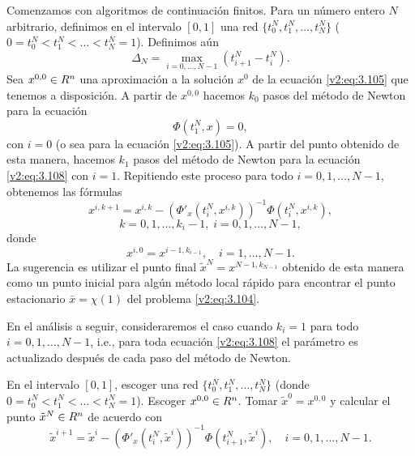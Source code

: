 Comenzamos con algoritmos de continuación finitos. Para un número entero $N$ arbitrario, definimos en el intervalo $[0, 1]$ una red $\{t_0^N, t_1^N, \dots, t_N^N\}$ ($0 = t_0^N < t_1^N < \dots < t_N^N = 1$). Definimos aún
\begin{equation}
    \Delta_N = \max_{i=0, \dots, N-1} (t_{i+1}^N - t_i^N).
    \label{v2:eq:3.107}
\end{equation}
Sea $x^{0,0} \in R^n$ una aproximación a la solución $x^0$ de la ecuación \eqref{v2:eq:3.105} que tenemos a disposición. A partir de $x^{0,0}$ hacemos $k_0$ pasos del método de Newton para la ecuación
\begin{equation}
    \Phi(t_1^N, x) = 0,
    \label{v2:eq:3.108}
\end{equation}
con $i = 0$ (o sea para la ecuación \eqref{v2:eq:3.105}). A partir del punto obtenido de esta manera, hacemos $k_1$ pasos del método de Newton para la ecuación \eqref{v2:eq:3.108} con $i = 1$. Repitiendo este proceso para todo $i = 0, 1, \dots, N-1$, obtenemos las fórmulas
\begin{equation}
    x^{i, k+1} = x^{i, k} - (\Phi'_x(t_i^N, x^{i, k}))^{-1}\Phi(t_i^N, x^{i, k}),
    \label{v2:eq:3.109}
\end{equation}
\[
    k = 0, 1, \dots, k_i - 1, \; i = 0, 1, \dots, N-1,
\]
donde
\begin{equation}
    x^{i, 0} = x^{i-1, k_{i-1}}, \quad i = 1, \dots, N-1.
    \label{v2:eq:3.110}
\end{equation}
La sugerencia es utilizar el punto final $\tilde{x}^N = x^{N-1, k_{N-1}}$ obtenido de esta manera como un punto inicial para algún método local rápido para encontrar el punto estacionario $\bar{x} = \chi(1)$ del problema \eqref{v2:eq:3.104}.

En el análisis a seguir, consideraremos el caso cuando $k_i = 1$ para todo $i = 0, 1, \dots, N-1$, i.e., para toda ecuación \eqref{v2:eq:3.108} el parámetro es actualizado después de cada paso del método de Newton.

\begin{algorithm}
    En el intervalo $[0, 1]$, escoger una red $\{t_0^N, t_1^N, \dots, t_N^N\}$ (donde $0 = t_0^N < t_1^N < \dots < t_N^N = 1$). Escoger $x^{0,0} \in R^n$. Tomar $\tilde{x}^0 = x^{0,0}$ y calcular el punto $\tilde{x}^N \in R^n$ de acuerdo con
\begin{equation}
    \tilde{x}^{i+1} = \tilde{x}^i - (\Phi'_x(t_i^N, \tilde{x}^i))^{-1}\Phi(t_{i+1}^N, \tilde{x}^i), \quad i = 0, 1, \dots, N-1.
    \label{v2:eq:3.111}
\end{equation}
\end{algorithm}


